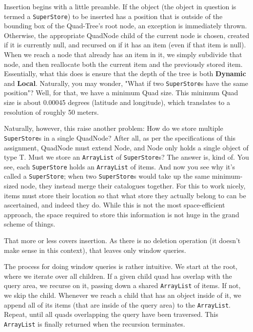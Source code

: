 \documentclass[12pt]{article}
\begin{document}
{Insertion begins with a little preamble. If the object (the object in question is termed a \texttt{SuperStore}) to be inserted has a position that is outside of the bounding box of the Quad-Tree's root node, an exception is immediately thrown. Otherwise, the appropriate QuadNode child of the current node is chosen, created if it is currently null, and recursed on if it has an item (even if that item is null). When we reach a node that already has an item in it, we simply subdivide that node, and then reallocate both the current item and the previously stored item. Essentially, what this does is ensure that the depth of the tree is both \textbf{Dynamic} and \textbf{Local}. Naturally, you may wonder, "What if two \texttt{SuperStore}s have the same position"? Well, for that, we have a minimum Quad size. This minimum Quad size is about 0.00045 degrees (latitude and longitude), which translates to a resolution of roughly 50 meters.

Naturally, however, this raise another problem: How do we store multiple \texttt{SuperStore}s in a single QuadNode? After all, as per the specifications of this assignment, QuadNode must extend Node, and Node only holds a single object of type T. Must we store an \texttt{ArrayList} of \texttt{SuperStore}s? The answer is, kind of. You see, each \texttt{SuperStore} holds an \texttt{ArrayList} of items. And now you see why it's called a \texttt{SuperStore}; when two \texttt{SuperStore}s would take up the same minimum-sized node, they instead merge their catalogues together. For this to work nicely, items must store their location so that what store they actually belong to can be ascertained, and indeed they do. While this is not the most space-efficient approach, the space required to store this information is not huge in the grand scheme of things.

That more or less covers insertion. As there is no deletion operation (it doesn't make sense in this context), that leaves only window queries.

The process for doing window queries is rather intuitive. We start at the root, where we iterate over all children. If a given child quad has overlap with the query area, we recurse on it, passing down a shared \texttt{ArrayList} of items. If not, we skip the child. Whenever we reach a child that has an object inside of it, we append all of its items (that are inside of the query area) to the \texttt{ArrayList}. Repeat, until all quads overlapping the query have been traversed. This \texttt{ArrayList} is finally returned when the recursion terminates.

}
\end{document}
